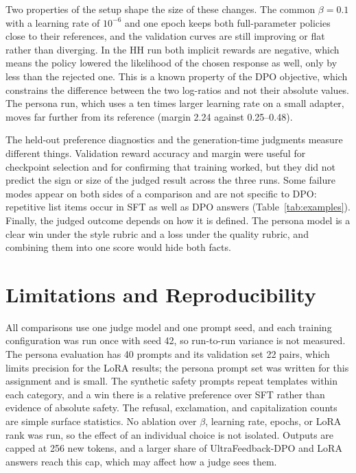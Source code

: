 \documentclass{article}
\begin{document}
Two properties of the setup shape the size of these changes. The common $\beta=0.1$ with a learning rate of $10^{-6}$ and one epoch keeps both full-parameter policies close to their references, and the validation curves are still improving or flat rather than diverging. In the HH run both implicit rewards are negative, which means the policy lowered the likelihood of the chosen response as well, only by less than the rejected one. This is a known property of the DPO objective, which constrains the difference between the two log-ratios and not their absolute values. The persona run, which uses a ten times larger learning rate on a small adapter, moves far further from its reference (margin 2.24 against 0.25--0.48).

The held-out preference diagnostics and the generation-time judgments measure different things. Validation reward accuracy and margin were useful for checkpoint selection and for confirming that training worked, but they did not predict the sign or size of the judged result across the three runs. Some failure modes appear on both sides of a comparison and are not specific to DPO: repetitive list items occur in SFT as well as DPO answers (Table~\ref{tab:examples}). Finally, the judged outcome depends on how it is defined. The persona model is a clear win under the style rubric and a loss under the quality rubric, and combining them into one score would hide both facts.

\section{Limitations and Reproducibility}
\label{sec:limitations}

All comparisons use one judge model and one prompt seed, and each training configuration was run once with seed 42, so run-to-run variance is not measured. The persona evaluation has 40 prompts and its validation set 22 pairs, which limits precision for the LoRA results; the persona prompt set was written for this assignment and is small. The synthetic safety prompts repeat templates within each category, and a win there is a relative preference over SFT rather than evidence of absolute safety. The refusal, exclamation, and capitalization counts are simple surface statistics. No ablation over $\beta$, learning rate, epochs, or LoRA rank was run, so the effect of an individual choice is not isolated. Outputs are capped at 256 new tokens, and a larger share of UltraFeedback-DPO and LoRA answers reach this cap, which may affect how a judge sees them.
\end{document}
